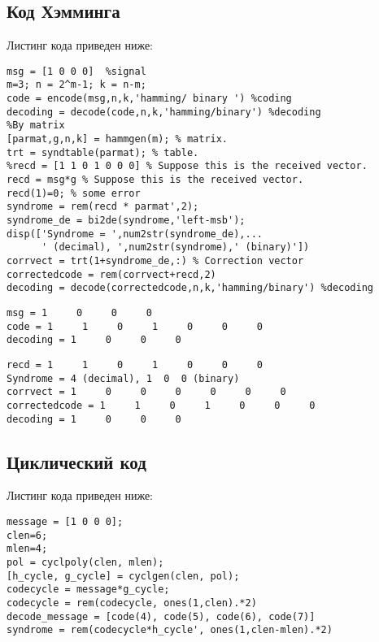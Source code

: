 \documentclass[10pt,a4paper,oneside]{article}
\begin{document}
\subsection{Код Хэмминга}
Листинг кода приведен ниже:

\begin{lstlisting}[caption=Кодирование Хэмминга]
%By Hamming
msg = [1 0 0 0]  %signal
m=3; n = 2^m-1; k = n-m;
code = encode(msg,n,k,'hamming/ binary ') %coding
decoding = decode(code,n,k,'hamming/binary') %decoding
%By matrix
[parmat,g,n,k] = hammgen(m); % matrix.
trt = syndtable(parmat); % table.
%recd = [1 1 0 1 0 0 0] % Suppose this is the received vector.
recd = msg*g % Suppose this is the received vector.
recd(1)=0; % some error
syndrome = rem(recd * parmat',2);
syndrome_de = bi2de(syndrome,'left-msb');
disp(['Syndrome = ',num2str(syndrome_de),...
      ' (decimal), ',num2str(syndrome),' (binary)'])
corrvect = trt(1+syndrome_de,:) % Correction vector
correctedcode = rem(corrvect+recd,2)
decoding = decode(correctedcode,n,k,'hamming/binary') %decoding
\end{lstlisting}

\begin{lstlisting}[caption=Результат работы encode/decode]
msg = 1     0     0     0
code = 1     1     0     1     0     0     0
decoding = 1     0     0     0
\end{lstlisting}

\begin{lstlisting}[caption= {Результат, полученный с использованием матрицы с исправлением ошибки}] 
recd = 1     1     0     1     0     0     0
Syndrome = 4 (decimal), 1  0  0 (binary)
corrvect = 1     0     0     0     0     0     0
correctedcode = 1     1     0     1     0     0     0
decoding = 1     0     0     0

\end{lstlisting}
\subsection{Циклический код}
Листинг кода приведен ниже:
\begin{lstlisting}[caption=Циклический код]
% Cycle code
message = [1 0 0 0];
clen=6;
mlen=4;
pol = cyclpoly(clen, mlen);
[h_cycle, g_cycle] = cyclgen(clen, pol);
codecycle = message*g_cycle;
codecycle = rem(codecycle, ones(1,clen).*2)
decode_message = [code(4), code(5), code(6), code(7)]
syndrome = rem(codecycle*h_cycle', ones(1,clen-mlen).*2)
\end{lstlisting}
\end{document}
